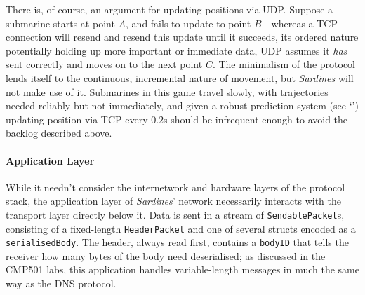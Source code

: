 \documentclass[a4paper, 9pt]{article}
\begin{document}
\begin{flushleft}
\vspace{5pt}\noindent
There is, of course, an argument for updating positions via UDP. Suppose a submarine starts at point $A$, and fails to update to point $B$ - whereas a TCP connection will resend and resend this update until it succeeds, its ordered nature potentially holding up more important or immediate data, UDP assumes it \textit{has} sent correctly and moves on to the next point $C$. The minimalism of the protocol lends itself to the continuous, incremental nature of movement, but \textit{Sardines} will not make use of it. Submarines in this game travel slowly, with trajectories needed reliably but not immediately, and given a robust prediction system (see `') updating position via TCP every 0.2s should be infrequent enough to avoid the backlog described above.

\paragraph{Application Layer} 

While it needn't consider the internetwork and hardware layers of the protocol stack, the application layer of \textit{Sardines}' network necessarily interacts with the transport layer directly below it. Data is sent in a stream of \texttt{SendablePacket}s, consisting of a fixed-length \texttt{HeaderPacket} and one of several structs encoded as a \texttt{serialisedBody}. The header, always read first, contains a \texttt{bodyID}  that tells the receiver how many bytes of the body need deserialised; as discussed in the CMP501 labs, this application handles variable-length messages in much the same way as the DNS protocol.


\end{flushleft}
\end{document}
